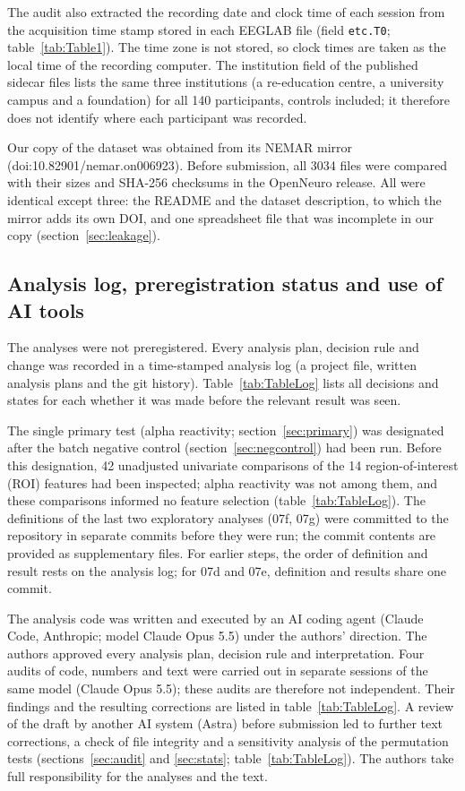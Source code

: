 The audit also extracted the recording date and clock time of each session from the acquisition time stamp stored in each EEGLAB file (field \texttt{etc.T0}; table~\ref{tab:Table1}). The time zone is not stored, so clock times are taken as the local time of the recording computer. The institution field of the published sidecar files lists the same three institutions (a re-education centre, a university campus and a foundation) for all 140 participants, controls included; it therefore does not identify where each participant was recorded.

Our copy of the dataset was obtained from its NEMAR mirror (doi:10.82901/nemar.on006923). Before submission, all 3034 files were compared with their sizes and SHA-256 checksums in the OpenNeuro release. All were identical except three: the README and the dataset description, to which the mirror adds its own DOI, and one spreadsheet file that was incomplete in our copy (section~\ref{sec:leakage}).

\subsection{Analysis log, preregistration status and use of AI tools}
\label{sec:log}

The analyses were not preregistered. Every analysis plan, decision rule and change was recorded in a time-stamped analysis log (a project file, written analysis plans and the git history). Table~\ref{tab:TableLog} lists all decisions and states for each whether it was made before the relevant result was seen.

The single primary test (alpha reactivity; section~\ref{sec:primary}) was designated after the batch negative control (section~\ref{sec:negcontrol}) had been run. Before this designation, 42 unadjusted univariate comparisons of the 14 region-of-interest (ROI) features had been inspected; alpha reactivity was not among them, and these comparisons informed no feature selection (table~\ref{tab:TableLog}). The definitions of the last two exploratory analyses (07f, 07g) were committed to the repository in separate commits before they were run; the commit contents are provided as supplementary files. For earlier steps, the order of definition and result rests on the analysis log; for 07d and 07e, definition and results share one commit.

The analysis code was written and executed by an AI coding agent (Claude Code, Anthropic; model Claude Opus 5.5) under the authors' direction. The authors approved every analysis plan, decision rule and interpretation. Four audits of code, numbers and text were carried out in separate sessions of the same model (Claude Opus 5.5); these audits are therefore not independent. Their findings and the resulting corrections are listed in table~\ref{tab:TableLog}. A review of the draft by another AI system (Astra) before submission led to further text corrections, a check of file integrity and a sensitivity analysis of the permutation tests (sections~\ref{sec:audit} and \ref{sec:stats}; table~\ref{tab:TableLog}). The authors take full responsibility for the analyses and the text.

